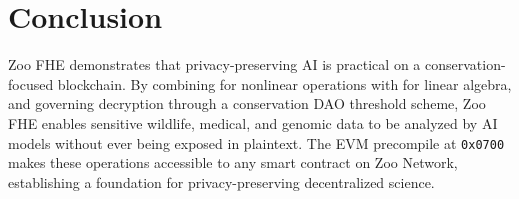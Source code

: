 \section{Conclusion}


Zoo FHE demonstrates that privacy-preserving AI is practical on a conservation-focused blockchain. By combining \TFHE{} for nonlinear operations with \CKKS{} for linear algebra, and governing decryption through a conservation DAO threshold scheme, Zoo FHE enables sensitive wildlife, medical, and genomic data to be analyzed by AI models without ever being exposed in plaintext. The EVM precompile at \texttt{0x0700} makes these operations accessible to any smart contract on Zoo Network, establishing a foundation for privacy-preserving decentralized science.

